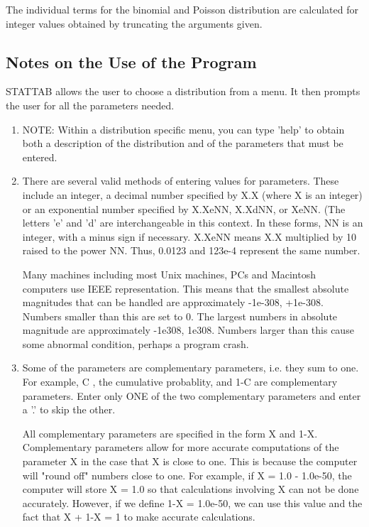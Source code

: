 \documentclass[12pt,dvips]{article}
\newcommand{\mysubsection}[1]
    {\color{green}\subsection{#1}\color{black}}
\begin{document}
     The  individual terms for the  binomial  and  Poisson distribution are
     calculated for  integer values obtained  by truncating   the arguments
     given.
     
\mysubsection{Notes on the Use of the Program}

     STATTAB  allows the user to  choose a distribution from a menu.
     It  then prompts the user for  all the parameters  needed.  
     
\begin{enumerate}

\item NOTE: Within a distribution specific menu, you can type 'help'
  to obtain both a description of the distribution and of the
  parameters that must be entered.

\item There are several valid  methods of entering values for parameters.
     These include an integer,  a decimal number specified  by X.X (where X
     is an integer)  or an exponential  number specified by X.XeNN, X.XdNN,
     or  XeNN.   (The  letters  'e' and  'd'  are  interchangeable in  this
     context.  In these  forms, NN  is  an integer,  with  a minus sign  if
     necessary.  X.XeNN means X.X multiplied by 10  raised to the power NN.
     Thus, 0.0123 and 123e-4 represent the same number.

     Many machines   including  most  Unix   machines, PCs   and  Macintosh
     computers use IEEE  representation.  This   means that the    smallest
     absolute magnitudes   that can be   handled are approximately -1e-308,
     +1e-308.  Numbers smaller than this are set to 0.  The largest numbers
     in absolute magnitude are approximately -1e308, 1e308.  Numbers larger
     than this cause some abnormal condition, perhaps a program crash.

\item Some of the parameters are complementary parameters,  i.e. they sum
     to one.  For  example,  C , the  cumulative  probablity, and  1-C  are
     complementary  parameters.  Enter only  ONE  of the  two complementary
     parameters and enter a '.' to skip the other.

     All  complementary  parameters are specified in the form  X  and  1-X.
     Complementary  parameters allow for  more accurate computations of the
     parameter  X in the case that X is  close to one.  This is because the
     computer  will  "round off"  numbers  close  to one.  For example,  if
     X = 1.0 - 1.0e-50,   the   computer  will   store   X = 1.0   so  that
     calculations involving  X  can not be done accurately.  However, if we
     define  1-X = 1.0e-50,  we  can  use  this  value  and  the  fact that 
     X + 1-X = 1 to make accurate calculations.


\end{enumerate}
\end{document}
